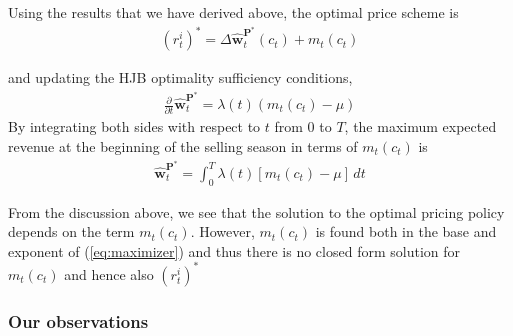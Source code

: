 Using the results that we have derived above, the optimal price scheme is
\begin{align}
(r_t^i)^\ast = \Delta \hat{\mathbf{w}}_t^{\mathbf{P}^\ast}(c_t)+m_t(c_t)\label{eq:optpricescheme}
\end{align}

and updating the HJB optimality sufficiency conditions,
\begin{align}
\frac{\partial}{\partial t}\hat{\mathbf{w}}_t^{\mathbf{P}^\ast} = \lambda(t)(m_t(c_t) - \mu)\label{eq:pdw}
\end{align}
By integrating both sides with respect to $t$ from $0$ to $T$,  the maximum expected revenue at the beginning of the selling season in terms of $m_t(c_t)$ is 
\begin{align}
\hat{\mathbf{w}}_t^{\mathbf{P}^\ast} = \int_{0}^{T}\lambda(t)\left[m_t(c_t)-\mu\right]\,dt
\end{align}

From the discussion above, we see that the solution to the optimal pricing policy depends on the term $m_t(c_t)$. However, $m_t(c_t)$ is found both in the base and exponent of (\ref{eq:maximizer}) and thus there is no closed form solution for $m_t(c_t)$ and hence also $(r_t^i)^\ast$



\subsubsection{Our observations}

